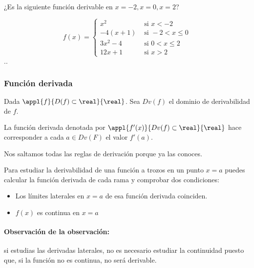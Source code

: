 \hline

\begin{problem}
¿Es la siguiente función derivable en $x=-2,x=0,x=2$?

\[f(x) = \begin{cases}
x^2 & \text{ si } x<-2\\
-4(x+1) & \text{ si } -2<x\leq0\\
3x^2-4 & \text{ si } 0<x\leq2\\
12x+1 & \text{ si } x>2
\end{cases}\]
\solution
.\vspace{10cm}.
\end{problem}


\subsubsection{Función derivada}

\begin{defn}
Dada $\appl{f}{D(f)\subset\real}{\real}$. Sea $Dv(f)$ el dominio de derivabilidad de $f$.

La función derivada denotada por $\appl{f'(x)}{Dv(f)\subset\real}{\real}$ hace corresponder a cada $a\in Dv(F)$ el valor $f'(a)$.
\end{defn}


\obs Nos saltamos todas las reglas de derivación porque ya las conoces.

\obs Para estudiar la derivabilidad de una función a trozos en un punto $x=a$ puedes calcular la función derivada de cada rama y comprobar dos condiciones:
\begin{itemize}
	\item Los límites laterales en $x=a$ de esa función derivada coinciden.
	\item $f(x)$ es continua en $x=a$
\end{itemize}

\paragraph{Observación de la observación:} si estudias las derivadas laterales, no es necesario estudiar la continuidad puesto que, si la función no es continua, no será derivable. 

